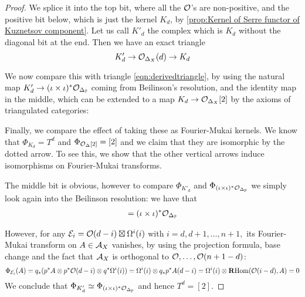 \begin{proof}
    We splice it into the top bit, where all the $\mathcal{O}$'s are non-positive, and the positive bit below, which is just the kernel $K_d$, by \ref{prop:Kernel of Serre functor of Kuznetsov component}. Let us call $K'_d$ the complex which is $K_d$ without the diagonal bit at the end. Then we have an exact triangle $$K'_d \rightarrow \mathcal{O}_{\Delta_X}(d)\rightarrow K_d$$

    We now compare this with triangle \ref{eqn:derivedtriangle}, by using the natural map $K'_d \rightarrow (\iota\times \iota)^*\mathcal{O}_{\Delta_{\mathbb{P}}}$ coming from Beilinson's resolution, and the identity map in the middle, which can be extended to a map $K_d \rightarrow \mathcal{O}_{\Delta_X}[2]$ by the axioms of triangulated categories: 

    \begin{center}\end{center}

    Finally, we compare the effect of taking these as Fourier-Mukai kernels. We know that $\Phi_{K_d}=T^d$ and $\Phi_{\mathcal{O}_\Delta [2]}=[2]$ and we claim that they are isomorphic by the dotted arrow. To see this, we show that the other vertical arrows induce isomorphisms on Fourier-Mukai transforms.

    The middle bit is obvious, however to compare $\Phi_{K'_d}$ and $\Phi_{(\iota\times \iota)^*\mathcal{O}_{\Delta_{\mathbb{P}}}}$ we simply look again into the Beilinson resolution: we have that \begin{gather*}
        [ \O (d-n-1)\boxtimes \Omega^{n+1}(n+1)\rightarrow \dots \rightarrow \O \boxtimes \Omega^{d}(d)\rightarrow K'_d]=(\iota\times \iota)^*\O_{\Delta_\P}
    \end{gather*}

    However, for any $\mathcal{E}_i=\mathcal{O}(d-i)\boxtimes \Omega^i(i)$ with $i=d,d+1,\dots,n+1,$ its Fourier-Mukai transform on $A\in \mathcal{A}_X$ vanishes, by using the projection formula, base change and the fact that $\mathcal{A}_X$ is orthogonal to $\mathcal{O},\dots, \mathcal{O}(n+1-d)$:$$\Phi_{\mathcal{E}_i}(A)=q_*(p^*A\otimes p^* \mathcal{O}(d-i)\otimes q^* \Omega^i(i))=\Omega^i(i)\otimes q_*p^* A(d-i)=\Omega^i(i) \otimes \operatorname{\mathbf{R} Hom}(\mathcal{O}(i-d),A)=0$$ We conclude that $\Phi_{K'_d}\simeq \Phi_{(\iota\times \iota)^*\mathcal{O}_{\Delta_{\mathbb{P}}}}$ and hence $T^d=[2]$.
\end{proof}

